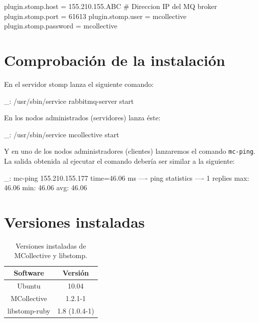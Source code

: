 \begin{bashcode}
plugin.stomp.host = 155.210.155.ABC # Direccion IP del MQ broker
plugin.stomp.port = 61613
plugin.stomp.user = mcollective
plugin.stomp.password = mcollective
\end{bashcode}


\section{Comprobación de la instalación}

En el servidor stomp lanza el siguiente comando:

\begin{bashcode}
_: /usr/sbin/service rabbitmq-server start
\end{bashcode}

En los nodos administrados (servidores) lanza éste:

\begin{bashcode}
_: /usr/sbin/service mcollective start
\end{bashcode}

Y en uno de los nodos administradores (clientes) lanzaremos el comando \texttt{mc-ping}. La salida obtenida al ejecutar el comando debería ser similar a la siguiente:

\begin{bashcode}
_: mc-ping
155.210.155.177                       time=46.06 ms
---- ping statistics ----
1 replies max: 46.06 min: 46.06 avg: 46.06
\end{bashcode}


\section{Versiones instaladas}

\begin{table}[!htbp]
\centering
   \begin{tabular}{|c|c|}
      \hline
      \textbf{Software} & \textbf{Versión} \\ \hline
      Ubuntu & 10.04 \\ \hline
      MCollective & 1.2.1-1 \\ \hline
      libstomp-ruby & 1.8 (1.0.4-1) \\ \hline
   \end{tabular}
\caption{Versiones instaladas de MCollective y libstomp.}
\label{table:mcollective-versions}
\end{table}
